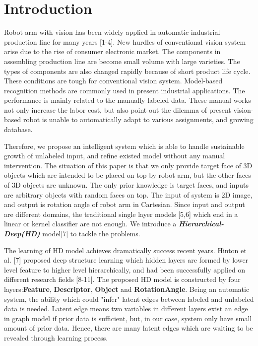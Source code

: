 \documentclass{tADR2e}
\begin{document}
\section{Introduction}

Robot arm with vision has been widely applied in automatic industrial production line for many years [1-4]. New hurdles of conventional vision system arise due to the rise of consumer electronic market. The components in assembling production line are become small volume with large varieties. The types of components are also changed rapidly because of short product life cycle. These conditions are tough for conventional vision system. Model-based recognition methods are commonly used in present industrial applications. The performance is mainly related to the manually labeled data. These manual works not only increase the labor cost, but also point out the dilemma of present vision-based robot is unable to automatically adapt to various assignments, and growing database.

Therefore, we propose an intelligent system which is able to handle sustainable growth of unlabeled input, and refine existed model without any manual intervention. The situation of this paper is that we only provide target face of 3D objects which are intended to be placed on top by robot arm, but the other faces of 3D objects are unknown. The only prior knowledge is target faces, and inputs are arbitrary objects with random faces on top. The input of system is 2D image, and output is rotation angle of robot arm in Cartesian. Since input and output are different domains, the traditional single layer models [5,6] which end in a linear or kernel classifier are not enough. We introduce a \textit{\textbf{Hierarchical-Deep(HD)}} model[7] to tackle the problems. 

The learning of HD model achieves dramatically success recent years. Hinton et al. [7] proposed deep structure learning which hidden layers are formed by lower level feature to higher level hierarchically, and had been successfully applied on different research fields [8-11]. The proposed HD model is constructed by four layers:\textbf{Feature}, \textbf{Descriptor}, \textbf{Object} and \textbf{RotationAngle}. Being an automatic system, the ability which could "infer" latent edges between labeled and unlabeled data is needed. Latent edge means two variables in different layers exist an edge in graph model if prior data is sufficient, but, in our case, system only have small amount of prior data. Hence, there are many latent edges which are waiting to be revealed through learning process. 
\end{document}
